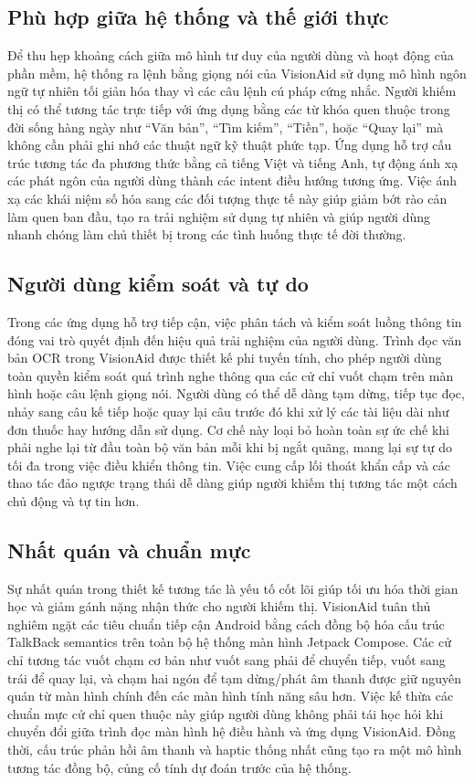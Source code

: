 \documentclass[a4paper,13pt]{report}
\begin{document}
\subsection{Phù hợp giữa hệ thống và thế giới thực}

Để thu hẹp khoảng cách giữa mô hình tư duy của người dùng và hoạt động của phần mềm, hệ thống ra lệnh bằng giọng nói của VisionAid sử dụng mô hình ngôn ngữ tự nhiên tối giản hóa thay vì các câu lệnh cú pháp cứng nhắc. Người khiếm thị có thể tương tác trực tiếp với ứng dụng bằng các từ khóa quen thuộc trong đời sống hàng ngày như ``Văn bản'', ``Tìm kiếm'', ``Tiền'', hoặc ``Quay lại'' mà không cần phải ghi nhớ các thuật ngữ kỹ thuật phức tạp. Ứng dụng hỗ trợ cấu trúc tương tác đa phương thức bằng cả tiếng Việt và tiếng Anh, tự động ánh xạ các phát ngôn của người dùng thành các intent điều hướng tương ứng. Việc ánh xạ các khái niệm số hóa sang các đối tượng thực tế này giúp giảm bớt rào cản làm quen ban đầu, tạo ra trải nghiệm sử dụng tự nhiên và giúp người dùng nhanh chóng làm chủ thiết bị trong các tình huống thực tế đời thường.

\subsection{Người dùng kiểm soát và tự do}

Trong các ứng dụng hỗ trợ tiếp cận, việc phân tách và kiểm soát luồng thông tin đóng vai trò quyết định đến hiệu quả trải nghiệm của người dùng. Trình đọc văn bản OCR trong VisionAid được thiết kế phi tuyến tính, cho phép người dùng toàn quyền kiểm soát quá trình nghe thông qua các cử chỉ vuốt chạm trên màn hình hoặc câu lệnh giọng nói. Người dùng có thể dễ dàng tạm dừng, tiếp tục đọc, nhảy sang câu kế tiếp hoặc quay lại câu trước đó khi xử lý các tài liệu dài như đơn thuốc hay hướng dẫn sử dụng. Cơ chế này loại bỏ hoàn toàn sự ức chế khi phải nghe lại từ đầu toàn bộ văn bản mỗi khi bị ngắt quãng, mang lại sự tự do tối đa trong việc điều khiển thông tin. Việc cung cấp lối thoát khẩn cấp và các thao tác đảo ngược trạng thái dễ dàng giúp người khiếm thị tương tác một cách chủ động và tự tin hơn.

\subsection{Nhất quán và chuẩn mực}

Sự nhất quán trong thiết kế tương tác là yếu tố cốt lõi giúp tối ưu hóa thời gian học và giảm gánh nặng nhận thức cho người khiếm thị. VisionAid tuân thủ nghiêm ngặt các tiêu chuẩn tiếp cận Android bằng cách đồng bộ hóa cấu trúc TalkBack semantics trên toàn bộ hệ thống màn hình Jetpack Compose. Các cử chỉ tương tác vuốt chạm cơ bản như vuốt sang phải để chuyển tiếp, vuốt sang trái để quay lại, và chạm hai ngón để tạm dừng/phát âm thanh được giữ nguyên quán từ màn hình chính đến các màn hình tính năng sâu hơn. Việc kế thừa các chuẩn mực cử chỉ quen thuộc này giúp người dùng không phải tái học hỏi khi chuyển đổi giữa trình đọc màn hình hệ điều hành và ứng dụng VisionAid. Đồng thời, cấu trúc phản hồi âm thanh và haptic thống nhất cũng tạo ra một mô hình tương tác đồng bộ, củng cố tính dự đoán trước của hệ thống.
\end{document}
